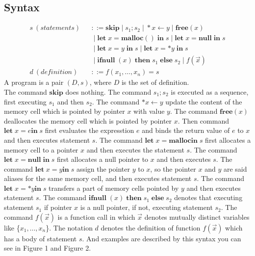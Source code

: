 \documentclass[english]{jssst_ppl} %
\newcommand\tB{\;|\;}
\newcommand\LET{\mathbf{let}\;}
\newcommand\IN{\mathbf{in}\;}
\newcommand\SKIP{\mathbf{skip}}
\newcommand\NULL{\mathbf{null}\;}
\newcommand\IFNULL{\mathbf{ifnull}\;}
\newcommand\THEN{\mathbf{then}\;}
\newcommand\ELSE{\mathbf{else}\;}
\newcommand\MALLOC{\mathbf{malloc()}\;}
\newcommand\Malloc{\mathbf{malloc}}
\newcommand\Free{\mathbf{free}}
\newcommand\Cirx{(x)}
\begin{document}
\subsection{Syntax}
\begin{eqnarray*}
  s \ (statements)& &::=  \SKIP \tB s_{1};s_{2} \tB *x \leftarrow y \tB \Free \Cirx \\
  & & \tB \LET x = \MALLOC \IN s \tB \LET x = \NULL \IN s  \\
  & & \tB \LET x = y \; \IN s \tB   \LET x = *y \; \IN s \\
  & &\tB \IFNULL(x) \; \THEN s_{1}\; \ELSE s_{2} \tB f(\vec{x})\\
  d \ (definition)& &::= f(x_{1},\dots,x_{n}) = s
\end{eqnarray*}
A program is a pair $(D,s)$, where $D$ is the set of definition.\\
The command $\SKIP$ does nothing. The command $s_{1};s_{2}$ is executed as a sequence, first executing $s_{1}$ and then $s_{2}$. The command $*x \leftarrow y$ update the content of the memory cell which is pointed by pointer $x$ with value $y$. The command $\Free \Cirx$ deallocates the memory cell which is pointed by pointer $x$. Then command $\LET x = e \IN s$ first evaluates the expresstion $e$ and binds the return value of $e$ to $x$ and then executes statement $s$. The command $\LET x = \Malloc \IN s$ first allocates a memory cell to a pointer $x$ and then executes the statement $s$. The command $\LET x = \NULL \IN s$ first allocates a null pointer to $x$ and then executes $s$. The command $\LET x = y \IN s$ assign the pointer $y$ to $x$, so the pointer $x$ and $y$ are said aliases for the same memory cell, and then executes statement $s$. The command $\LET x = *y \IN s$ transfers a part of memory cells pointed by $y$ and then executes statement $s$. The command $\IFNULL(x) \; \THEN s_{1} \; \ELSE s_{2}$ denotes that  executing statement $s_{1}$ if pointer $x$ is a null pointer, if not, executing statement $s_{2}$. The command $f(\vec{x})$ is a function call in which $\vec{x}$ denotes mutually distinct variables like \{$x_{1}, \dots, x_{n}$\}. The notation $d$ denotes the definition of function $f(\vec{x})$ which has a body of statement $s$. And examples are described by this syntax you can see in Figure 1 and  Figure 2.
\end{document}
